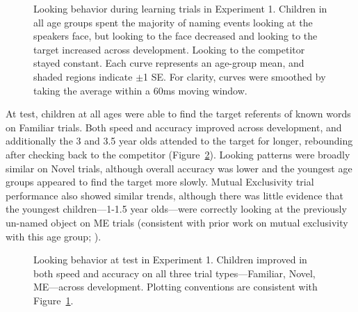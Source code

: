 \documentclass[man,floatsintext]{apa6}
\begin{document}
\begin{figure}[tb]
	\caption{\label{fig:exp1_train_spaghetti} Looking behavior during learning trials in Experiment 1. Children in all age groups spent the majority of naming events looking at the speakers face, but looking to the face decreased and looking to the target increased across development. Looking to the competitor stayed constant. Each curve represents an age-group mean, and shaded regions indicate $\pm$1 SE. For clarity, curves were smoothed by taking the average within a 60ms moving window.}
\end{figure}

At test, children at all ages were able to find the target referents of known words on Familiar trials. Both speed and accuracy improved across development, and additionally the 3 and 3.5 year olds attended to the target for longer, rebounding after checking back to the competitor (Figure~\ref{fig:exp1_test_spaghetti}). Looking patterns were broadly similar on Novel trials, although overall accuracy was lower and the youngest age groups appeared to find the target more slowly. Mutual Exclusivity trial performance also showed similar trends, although there was little evidence that the youngest children---1-1.5 year olds---were correctly looking at the previously un-named object on ME trials (consistent with prior work on mutual exclusivity with this age group; ).

\begin{figure}[tb]
	\caption{\label{fig:exp1_test_spaghetti}Looking behavior at test in Experiment 1. Children improved in both speed and accuracy on all three trial types---Familiar, Novel, ME---across development. Plotting conventions are consistent with Figure~\ref{fig:exp1_train_spaghetti}.}
\end{figure}
\end{document}

